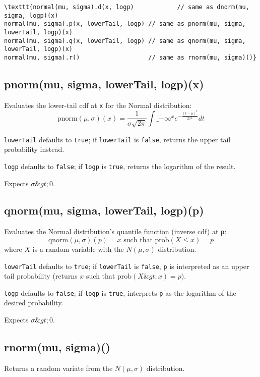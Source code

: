 \documentclass{article}
\begin{document}
\begin{lstlisting}
\texttt{normal(mu, sigma).d(x, logp)            // same as dnorm(mu, sigma, logp)(x)
normal(mu, sigma).p(x, lowerTail, logp) // same as pnorm(mu, sigma, lowerTail, logp)(x)
normal(mu, sigma).q(x, lowerTail, logp) // same as qnorm(mu, sigma, lowerTail, logp)(x)
normal(mu, sigma).r()                   // same as rnorm(mu, sigma)()}\end{lstlisting}

    \subsection*{pnorm(mu, sigma, lowerTail, logp)(x)}
    Evaluates the lower-tail cdf at \texttt{x} for the Normal distribution:
$$\textrm{pnorm}(\mu, \sigma)(x) = \frac{1}{\sigma \sqrt{2\pi}}\int\_{-\infty}^x e^{\displaystyle -\frac{(t-\mu)^2}{2\sigma^2}}dt$$


\texttt{lowerTail} defaults to \texttt{true}; if \texttt{lowerTail} is \texttt{false}, returns
the upper tail probability instead.


\texttt{logp} defaults to \texttt{false}; if \texttt{logp} is \texttt{true}, returns the logarithm
of the result.


Expects $\sigma \&gt; 0$.


    \subsection*{qnorm(mu, sigma, lowerTail, logp)(p)}
    Evaluates the Normal distribution's quantile function (inverse cdf) at \texttt{p}:
$$\textrm{qnorm}(\mu, \sigma)(p) = x \textrm{ such that } \textrm{prob}(X \leq x) = p$$
where $X$ is a random variable with the $N(\mu,\sigma)$ distribution.


\texttt{lowerTail} defaults to \texttt{true}; if \texttt{lowerTail} is \texttt{false}, \texttt{p} is
interpreted as an upper tail probability (returns
$x$ such that $\textrm{prob}(X \&gt; x) = p)$.


\texttt{logp} defaults to \texttt{false}; if \texttt{logp} is \texttt{true}, interprets \texttt{p} as
the logarithm of the desired probability.


Expects $\sigma \&gt; 0$.


    \subsection*{rnorm(mu, sigma)()}
    Returns a random variate from the $N(\mu, \sigma)$ distribution.
\end{document}
